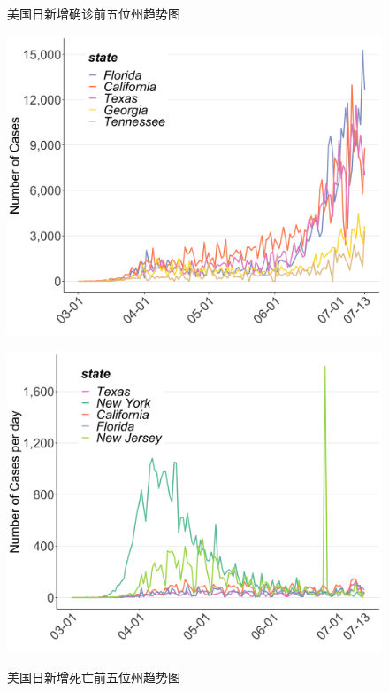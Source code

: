 \documentclass[
]{article}
\begin{document}
\begin{figure}[H]
\centering
\begin{minipage}[b]{0.48\linewidth}
\caption{美国日新增确诊前五位州趋势图}
\includegraphics[]{./input/covid5.png}
\label{}
\end{minipage}
\quad
\begin{minipage}[b]{0.48\linewidth}
\caption{美国日新增死亡前五位州趋势图}
\includegraphics[]{./input/covid6.png}
\label{}
\end{minipage}
\end{figure}
\end{document}
